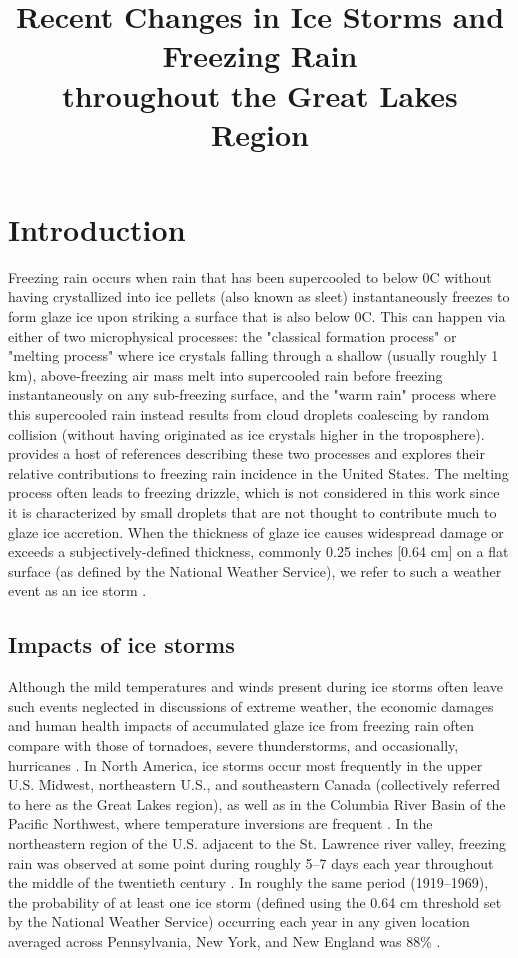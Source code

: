 \documentclass[twocol]{ametsoc}
\title{Recent Changes in Ice Storms and Freezing Rain\\ throughout the Great Lakes Region}
\affiliation{ National Renewable Energy Laboratory, Golden, Colorado}
\begin{document}
\maketitle
%
\section{Introduction}
Freezing rain occurs when rain that has been supercooled to below 0\degree C without having crystallized into ice pellets (also known as sleet) instantaneously freezes to form glaze ice upon striking a surface that is also below 0\degree C. This can happen via either of two microphysical processes: the "classical formation process" or "melting process" where ice crystals falling through a shallow (usually roughly 1 km), above-freezing air mass melt into supercooled rain before freezing instantaneously on any sub-freezing surface, and the "warm rain" process where this supercooled rain instead results from cloud droplets coalescing by random collision (without having originated as ice crystals higher in the troposphere). \citet{rauber2000relative} provides a host of references describing these two processes and explores their relative contributions to freezing rain incidence in the United States. The melting process often leads to freezing drizzle, which is not considered in this work since it is characterized by small droplets that are not thought to contribute much to glaze ice accretion. When the thickness of glaze ice causes widespread damage or exceeds a subjectively-defined thickness, commonly 0.25 inches [0.64 cm] on a flat surface (as defined by the National Weather Service), we refer to such a weather event as an ice storm \citep{nwsglossary}.

\subsection{Impacts of ice storms}
Although the mild temperatures and winds present during ice storms often leave such events neglected in discussions of extreme weather, the economic damages and human health impacts of accumulated glaze ice from freezing rain often compare with those of tornadoes, severe thunderstorms, and occasionally, hurricanes \citep{lott2006tracking}. In North America, ice storms occur most frequently in the upper U.S. Midwest, northeastern U.S., and southeastern Canada (collectively referred to here as the Great Lakes region), as well as in the Columbia River Basin of the Pacific Northwest, where temperature inversions are frequent \citep{changnon2003temporal, bernstein2000regional}. In the northeastern region of the U.S. adjacent to the St. Lawrence river valley, freezing rain was observed at some point during roughly 5--7 days each year throughout the middle of the twentieth century \citep{changnon2003temporal}. In roughly the same period (1919--1969), the probability of at least one ice storm (defined using the 0.64 cm threshold set by the National Weather Service) occurring each year in any given location averaged across Pennsylvania, New York, and New England was 88\% \citep{tattelman1973estimated}. 
\end{document}
